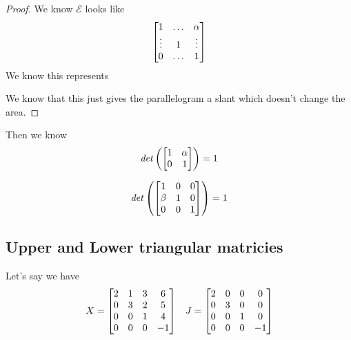 \documentclass[11pt]{book}
\begin{document}
\begin{proof}
    We know $\mathcal{E} $ looks like 
    \[
    \mat[b]{ 1 & \ldots  & \alpha  \\ \vdots   & 1 & \vdots  \\ 0 & \ldots  & 1 }
    \]
    We know this represents
    \begin{center}
    \end{center}
We know that this just gives the parallelogram a slant which doesn't change the area.
\end{proof}

\begin{eg}
    Then we know 
    \[
    \mathit{det} \left(\mat[b]{ 1 & \alpha  \\ 0 & 1 }\right) = 1
    \]
\end{eg}

\begin{eg}
    \[
    \mathit{det} \left(\mat[b]{ 1 & 0 & 0 \\ \beta  & 1 & 0 \\ 0 & 0 & 1 }\right) = 1
    \]
\end{eg}

\subsection{Upper and Lower triangular matricies}%
\label{sub:upper_and_lower_triangular_matricies}

Let's say we have 
\begin{align*}
    X= \mat[b]{ 2 & 1 & 3 & 6 \\ 0 & 3 & 2 & 5 \\ 0 & 0 & 1 & 4 \\ 0 & 0 & 0 & -1 } && J= \mat[b]{ 2 & 0 & 0 & 0 \\ 0 & 3 & 0 & 0 \\ 0 & 0 & 1 & 0 \\ 0 & 0 & 0 & -1 }
\end{align*}
\end{document}
